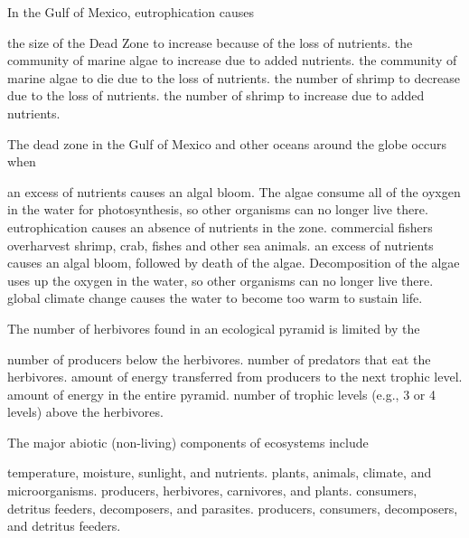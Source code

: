 \question
In the Gulf of Mexico, eutrophication causes

\begin{choices}
\choice the size of the Dead Zone to increase because of the loss of nutrients.%
\correctchoice the community of marine algae to increase due to added nutrients.%
\choice the community of marine algae to die due to the loss of nutrients.%
\choice the number of shrimp to decrease due to the loss of nutrients.%
\choice the number of shrimp to increase due to added nutrients.%
\end{choices}

\question
The dead zone in the Gulf of Mexico and other oceans around the globe occurs when

\begin{choices}
\choice an excess of nutrients causes an algal bloom. The algae consume all of the oyxgen in the water for photosynthesis, so other organisms can no longer live there.%
\choice eutrophication causes an absence of nutrients in the zone.%
\choice commercial fishers overharvest shrimp, crab, fishes and other sea animals.%
\correctchoice an excess of nutrients causes an algal bloom, followed by death of the algae. Decomposition of the algae uses up the oxygen in the water, so other organisms can no longer live there.%
\choice global climate change causes the water to become too warm to sustain life.%
\end{choices}


\question
The number of herbivores found in an ecological pyramid is limited by the

\begin{choices}
\choice number of producers below the herbivores.%
\choice number of predators that eat the herbivores.%
\correctchoice amount of energy transferred from producers to the next trophic level.%
\choice amount of energy in the entire pyramid.%
\choice number of trophic levels (e.g., 3 or 4 levels) above the herbivores.%
\end{choices}

\question
The major abiotic (non-living) components of ecosystems include

\begin{choices}
\correctchoice temperature, moisture, sunlight, and nutrients.%
\choice plants, animals, climate, and microorganisms.%
\choice producers, herbivores, carnivores, and plants.%
\choice consumers, detritus feeders, decomposers, and parasites.%
\choice producers, consumers, decomposers, and detritus feeders.%
\end{choices}

